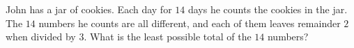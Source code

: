 John has a jar of cookies. Each day for $14$ days he counts the cookies in the jar. The $14$ numbers he counts are all different, and each of them leaves remainder $2$ when divided by $3$. What is the least possible total of the $14$ numbers?
